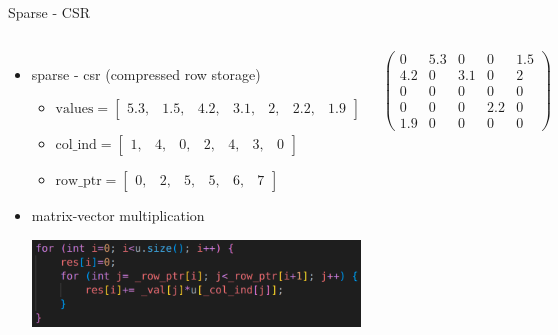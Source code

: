 \documentclass[aspectratio=169,xcolor=dvipsnames]{beamer}
\begin{document}
\begin{frame}{Sparse - CSR}
    \begin{columns}[c] %

\begin{itemize}
\item sparse - csr (compressed row storage)
	\begin{itemize}
       \item $\mathrm{values} = \begin{bmatrix}
		5.3, & 1.5, & 4.2, & 3.1, & 2, & 2.2, & 1.9 
		\end{bmatrix}$
		\item $\mathrm{col\_ind} = \begin{bmatrix}
		1, & 4, & 0, & 2, & 4, & 3, & 0 
		\end{bmatrix}$
		\item $\mathrm{row\_ptr} = \begin{bmatrix}
		0, & 2, & 5, & 5, & 6, & 7 
		\end{bmatrix}$
	\end{itemize}
\item matrix-vector multiplication
\begin{center}
    \includegraphics[width=0.8\linewidth]{matrix_vector_csr.png}
    \end{center}
\end{itemize}
        
        $ \left( \begin{array}{rrrrr} 
0 & 5.3 & 0 & 0 & 1.5\\ 
4.2 & 0& 3.1 & 0 & 2\\ 
0 & 0 & 0 & 0 & 0 \\
0 & 0 & 0 & 2.2 & 0 \\
1.9 & 0 & 0 & 0 & 0
\end{array} \right) $

    \end{columns}
\end{frame}
\end{document}
